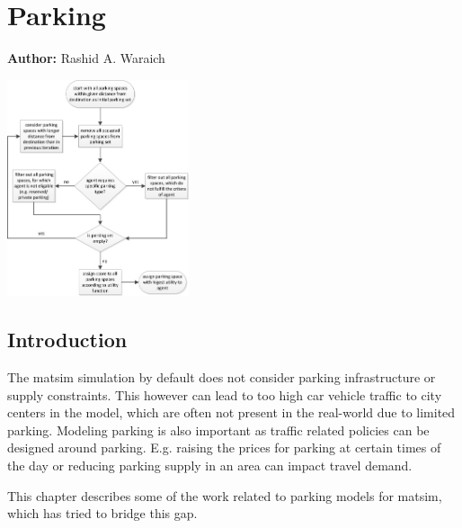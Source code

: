 \chapter{Parking}
\label{ch:parking}

\hfill \textbf{Author:} Rashid A. Waraich

\begin{center} \includegraphics[width=0.4\textwidth, angle=0]{extending/figures/Parking/parking_algo.png} \end{center}


\section{Introduction} 
The \gls{matsim} simulation by default does not consider parking infrastructure or supply constraints. This however can lead to too high car vehicle traffic to city centers in the model, which are often not present in the real-world due to limited parking. Modeling parking is also important as traffic related policies can be designed around parking. E.g. raising the prices for parking at certain times of the day or reducing parking supply in an area can impact travel demand. 

This chapter describes some of the work related to parking models for \gls{matsim}, which has tried to bridge this gap.

